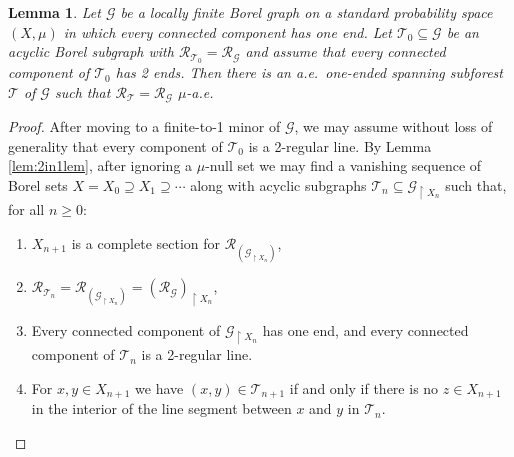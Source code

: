 \documentclass[11pt]{amsart}
\theoremstyle{definition}
\theoremstyle{plain}
\newtheorem{lemma}[definition]{Lemma}
\newcommand{\<}{\langle}
\renewcommand{\>}{\rangle}
\newcommand{\Ggraph}{\mathcal{G}}
\newcommand{\Tgraph}{\mathcal{T}}
\newcommand\RR{\mathscr{R}}
\begin{document}
\begin{lemma}\label{lem:2in1}
Let ${\Ggraph}$ be a locally finite Borel graph on a standard probability
space $(X,\mu)$ in which every
connected component has one end. Let ${\Tgraph_0}\subseteq {\Ggraph}$ be an
acyclic Borel subgraph with $\RR_{{\Tgraph_0}}=\RR_{{\Ggraph}}$ and assume that
every connected component of ${\Tgraph_0}$ has 2 ends. Then there is an a.e.\ one-ended spanning subforest $\Tgraph$ of
$\Ggraph$ such that
$\RR_{\Tgraph} = \RR_\Ggraph$ $\mu$-a.e.
\end{lemma}
\begin{proof}
After moving to a finite-to-1 minor of $\Ggraph$, we may assume without
loss of generality that every component of $\Tgraph_0$ is a 2-regular
line. By Lemma \ref{lem:2in1lem}, after ignoring a $\mu$-null set we may find a vanishing sequence of Borel sets $X= X_0\supseteq X_1\supseteq\cdots$ along with acyclic subgraphs $\Tgraph_n\subseteq \Ggraph_{\restriction X_n}$ such that, for all $n\geq 0$:
\begin{enumerate}
\item $X_{n+1}$ is a complete section for $\RR_{(\Ggraph _{\restriction  X_n})}$,
\item $\RR_{\Tgraph _n } =\RR_{(\Ggraph _{\restriction  X_n})} = (\RR_{\Ggraph})_{\restriction  X_{n}}$,
\item Every connected component of ${\Ggraph}_{\restriction  X_n}$ has one end, and every connected component of ${\Tgraph}_n$ is a 2-regular line.
\item For $x,y\in X_{n+1}$ we have $(x,y)\in {\Tgraph}_{n+1}$ if and only if there is no $z\in X_{n+1}$ in the interior of the line segment between $x$ and $y$ in ${\Tgraph}_n$.
\end{enumerate}

\end{proof}
\end{document}
